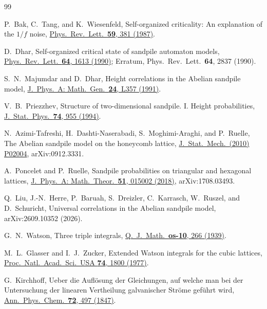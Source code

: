 \documentclass[aps,pre,10pt,twocolumn,superscriptaddress,nofootinbib]{revtex4-2}
\begin{document}
\begin{thebibliography}{99}

P.~Bak, C.~Tang, and K.~Wiesenfeld,
Self-organized criticality: An explanation of the $1/f$ noise,
\href{https://doi.org/10.1103/PhysRevLett.59.381}{Phys.\ Rev.\ Lett.\ \textbf{59}, 381 (1987)}.

D.~Dhar,
Self-organized critical state of sandpile automaton models,
\href{https://doi.org/10.1103/PhysRevLett.64.1613}{Phys.\ Rev.\ Lett.\ \textbf{64}, 1613 (1990)};
Erratum, Phys.\ Rev.\ Lett.\ \textbf{64}, 2837 (1990).

S.~N.~Majumdar and D.~Dhar,
Height correlations in the Abelian sandpile model,
\href{https://doi.org/10.1088/0305-4470/24/7/008}{J.\ Phys.\ A: Math.\ Gen.\ \textbf{24}, L357 (1991)}.

V.~B.~Priezzhev,
Structure of two-dimensional sandpile. I. Height probabilities,
\href{https://doi.org/10.1007/BF02188212}{J.\ Stat.\ Phys.\ \textbf{74}, 955 (1994)}.

N.~Azimi-Tafreshi, H.~Dashti-Naserabadi, S.~Moghimi-Araghi, and P.~Ruelle,
The Abelian sandpile model on the honeycomb lattice,
\href{https://doi.org/10.1088/1742-5468/2010/02/P02004}{J.\ Stat.\ Mech.\ (2010) P02004},
arXiv:0912.3331.

A.~Poncelet and P.~Ruelle,
Sandpile probabilities on triangular and hexagonal lattices,
\href{https://doi.org/10.1088/1751-8121/aa9255}{J.\ Phys.\ A: Math.\ Theor.\ \textbf{51}, 015002 (2018)},
arXiv:1708.03493.

Q.~Liu, J.-N.~Herre, P.~Baruah, S.~Dreizler, C.~Karrasch, W.~Ruszel, and D.~Schuricht,
Universal correlations in the Abelian sandpile model,
arXiv:2609.10352 (2026).

G.~N.~Watson,
Three triple integrals,
\href{https://doi.org/10.1093/qmath/os-10.1.266}{Q.\ J.\ Math.\ \textbf{os-10}, 266 (1939)}.

M.~L.~Glasser and I.~J.~Zucker,
Extended Watson integrals for the cubic lattices,
\href{https://doi.org/10.1073/pnas.74.5.1800}{Proc.\ Natl.\ Acad.\ Sci.\ USA \textbf{74}, 1800 (1977)}.

G.~Kirchhoff,
Ueber die Aufl\"osung der Gleichungen, auf welche man bei der Untersuchung der linearen
Vertheilung galvanischer Str\"ome gef\"uhrt wird,
\href{https://doi.org/10.1002/andp.18471481202}{Ann.\ Phys.\ Chem.\ \textbf{72}, 497 (1847)}.


\end{thebibliography}
\end{document}
